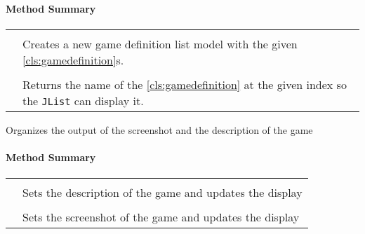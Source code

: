 \paragraph*{Method Summary}
\paragraph*{}
\begin{longtable}{Lp{10cm}}
	\startmethodtable
	 \\
	& Creates a new game definition list model with the given \ref{cls:gamedefinition}s. \\
	 \\
	& Returns the name of the \ref{cls:gamedefinition} at the given index so the \texttt{JList} can display it. \\
	\hline
\end{longtable}

\pagebreak

Organizes the output of the screenshot and the description of the game \\

\centerdash

\paragraph*{Method Summary}
\paragraph*{}
\begin{longtable}{Lp{10cm}}
	\startmethodtable
	 \\
	& Sets the description of the game and updates the display \\
	 \\
	& Sets the screenshot of the game and updates the display \\
	\hline
\end{longtable}